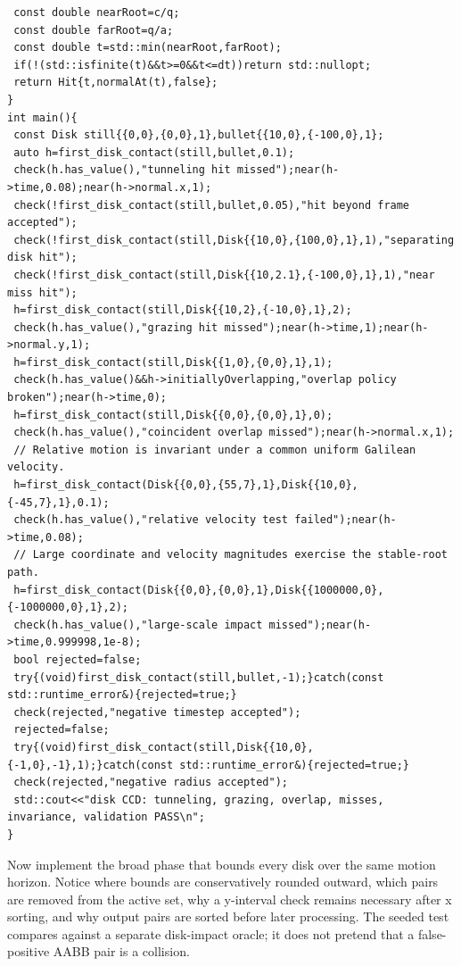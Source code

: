 \begin{verbatim}
 const double nearRoot=c/q;
 const double farRoot=q/a;
 const double t=std::min(nearRoot,farRoot);
 if(!(std::isfinite(t)&&t>=0&&t<=dt))return std::nullopt;
 return Hit{t,normalAt(t),false};
}
int main(){
 const Disk still{{0,0},{0,0},1},bullet{{10,0},{-100,0},1};
 auto h=first_disk_contact(still,bullet,0.1);
 check(h.has_value(),"tunneling hit missed");near(h->time,0.08);near(h->normal.x,1);
 check(!first_disk_contact(still,bullet,0.05),"hit beyond frame accepted");
 check(!first_disk_contact(still,Disk{{10,0},{100,0},1},1),"separating disk hit");
 check(!first_disk_contact(still,Disk{{10,2.1},{-100,0},1},1),"near miss hit");
 h=first_disk_contact(still,Disk{{10,2},{-10,0},1},2);
 check(h.has_value(),"grazing hit missed");near(h->time,1);near(h->normal.y,1);
 h=first_disk_contact(still,Disk{{1,0},{0,0},1},1);
 check(h.has_value()&&h->initiallyOverlapping,"overlap policy broken");near(h->time,0);
 h=first_disk_contact(still,Disk{{0,0},{0,0},1},0);
 check(h.has_value(),"coincident overlap missed");near(h->normal.x,1);
 // Relative motion is invariant under a common uniform Galilean velocity.
 h=first_disk_contact(Disk{{0,0},{55,7},1},Disk{{10,0},{-45,7},1},0.1);
 check(h.has_value(),"relative velocity test failed");near(h->time,0.08);
 // Large coordinate and velocity magnitudes exercise the stable-root path.
 h=first_disk_contact(Disk{{0,0},{0,0},1},Disk{{1000000,0},{-1000000,0},1},2);
 check(h.has_value(),"large-scale impact missed");near(h->time,0.999998,1e-8);
 bool rejected=false;
 try{(void)first_disk_contact(still,bullet,-1);}catch(const std::runtime_error&){rejected=true;}
 check(rejected,"negative timestep accepted");
 rejected=false;
 try{(void)first_disk_contact(still,Disk{{10,0},{-1,0},-1},1);}catch(const std::runtime_error&){rejected=true;}
 check(rejected,"negative radius accepted");
 std::cout<<"disk CCD: tunneling, grazing, overlap, misses, invariance, validation PASS\n";
}
\end{verbatim}

Now implement the broad phase that bounds every disk over the same motion horizon. Notice where bounds are conservatively rounded outward, which pairs are removed from the active set, why a y-interval check remains necessary after x sorting, and why output pairs are sorted before later processing. The seeded test compares against a separate disk-impact oracle; it does not pretend that a false-positive AABB pair is a collision.

